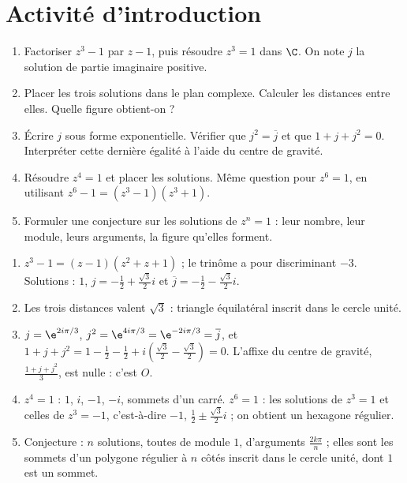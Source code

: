 \section{Activité d'introduction}
\begin{activity}[Les solutions de $z^n=1$ \mxchip{40 min}]
\begin{enumerate}
\item Factoriser $z^3-1$ par $z-1$, puis résoudre $z^3=1$ dans $\C$. On note $j$ la solution de partie imaginaire positive.
\item Placer les trois solutions dans le plan complexe. Calculer les distances entre elles. Quelle figure obtient-on ?
\item Écrire $j$ sous forme exponentielle. Vérifier que $j^2=\overline j$ et que $1+j+j^2=0$. Interpréter cette dernière égalité à l'aide du centre de gravité.
\item Résoudre $z^4=1$ et placer les solutions. Même question pour $z^6=1$, en utilisant $z^6-1=\left(z^3-1\right)\left(z^3+1\right)$.
\item Formuler une conjecture sur les solutions de $z^n=1$ : leur nombre, leur module, leurs arguments, la figure qu'elles forment.
\end{enumerate}
\end{activity}
\begin{solution}[Activité]
\begin{enumerate}
\item $z^3-1=(z-1)\left(z^2+z+1\right)$ ; le trinôme a pour discriminant $-3$. Solutions : $1$, $j=-\frac12+\frac{\sqrt3}2i$ et $\overline j=-\frac12-\frac{\sqrt3}2i$.
\item Les trois distances valent $\sqrt3$ : triangle équilatéral inscrit dans le cercle unité.
\item $j=\e^{2i\pi/3}$, $j^2=\e^{4i\pi/3}=\e^{-2i\pi/3}=\overline j$, et $1+j+j^2=1-\frac12-\frac12+i\left(\frac{\sqrt3}2-\frac{\sqrt3}2\right)=0$. L'affixe du centre de gravité, $\frac{1+j+j^2}3$, est nulle : c'est $O$.
\item $z^4=1$ : $1$, $i$, $-1$, $-i$, sommets d'un carré. $z^6=1$ : les solutions de $z^3=1$ et celles de $z^3=-1$, c'est-à-dire $-1$, $\frac12\pm\frac{\sqrt3}2i$ ; on obtient un hexagone régulier.
\item Conjecture : $n$ solutions, toutes de module $1$, d'arguments $\frac{2k\pi}n$ ; elles sont les sommets d'un polygone régulier à $n$ côtés inscrit dans le cercle unité, dont $1$ est un sommet.
\end{enumerate}
\end{solution}

